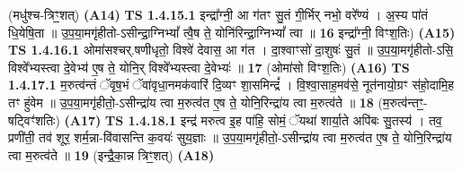 \documentclass[17pt]{extarticle}
\begin{document}
                  \newline
                      (मधु॑श्च-त्रिꣳ॒॒शत्)  \textbf{(A14)} \newline \newline
                                        \textbf{ TS 1.4.15.1} \newline
                  इन्द्रा᳚ग्नी॒ आ ग॑तꣳ सु॒तं गी॒र्भिर् नभो॒ वरे᳚ण्यं । अ॒स्य पा॑तं धि॒येषि॒ता ॥ उ॒प॒या॒मगृ॑हीतो-ऽसीन्द्रा॒ग्निभ्यां᳚ त्वै॒ष ते॒ योनि॑रिन्द्रा॒ग्निभ्यां᳚ त्वा ॥ \textbf{  16} \newline
                  \newline
                       इन्द्रा᳚ग्नी॒ विꣳश॒तिः)  \textbf{(A15)} \newline \newline
                                        \textbf{ TS 1.4.16.1} \newline
                  ओमा॑सश्चर्.षणीधृतो॒ विश्वे॑ देवास॒ आ ग॑त । दा॒श्वाꣳसो॑ दा॒शुषः॑ सु॒तं ॥ उ॒प॒या॒मगृ॑हीतो-ऽसि॒ विश्वे᳚भ्यस्त्वा दे॒वेभ्य॑ ए॒ष ते॒ योनि॒र् विश्वे᳚भ्यस्त्वा दे॒वेभ्यः॑ ॥ \textbf{  17} \newline
                  \newline
                      (ओमा॑सो विꣳश॒तिः)  \textbf{(A16)} \newline \newline
                                        \textbf{ TS 1.4.17.1} \newline
                  म॒रुत्व॑न्तं ॅवृष॒भं ॅवा॑वृधा॒नमक॑वारिं दि॒व्यꣳ शा॒समिन्द्रं᳚ । वि॒श्वा॒साह॒मव॑से॒ नूत॑नायो॒ग्रꣳ स॑हो॒दामि॒ह तꣳ हु॑वेम ॥ उ॒प॒या॒मगृ॑हीतो॒-ऽसीन्द्रा॑य त्वा म॒रुत्व॑त ए॒ष ते॒ योनि॒रिन्द्रा॑य त्वा म॒रुत्व॑ते ॥ \textbf{  18} \newline
                  \newline
                      (म॒रुत्व॑न्तꣳ॒॒-षट्विꣳ॑शतिः)  \textbf{(A17)} \newline \newline
                                        \textbf{ TS 1.4.18.1} \newline
                  इन्द्र॑ मरुत्व इ॒ह पा॑हि॒ सोमं॒ ॅयथा॑ शार्या॒ते अपि॑बः सु॒तस्य॑ । तव॒ प्रणी॑ती॒ तव॑ शूर॒ शर्म॒न्ना-वि॑वासन्ति क॒वयः॑ सुय॒ज्ञाः ॥ उ॒प॒या॒मगृ॑हीतो॒-ऽसीन्द्रा॑य त्वा म॒रुत्व॑त ए॒ष ते॒ योनि॒रिन्द्रा॑य त्वा म॒रुत्व॑ते ॥ \textbf{  19 } \newline
                  \newline
                      (इन्द्रै॒का॒न्न त्रिꣳ॒॒शत्)  \textbf{(A18)} \newline \newline
\end{document}
